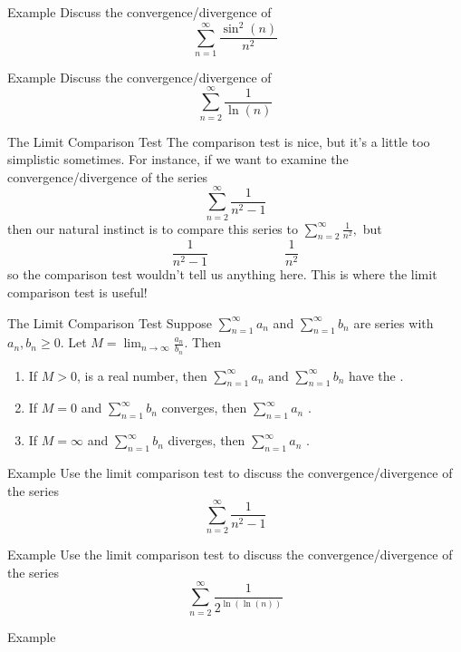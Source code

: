\documentclass[presentation]{beamer}
\begin{document}
\begin{frame}[label={sec:org9f4624e}]{Example}
Discuss the convergence/divergence of
\[
\sum\limits_{n=1}^{\infty} \frac{\sin^2(n)}{n^2}\]
\vspace{10in}
\end{frame}

\begin{frame}[label={sec:orgf86e12e}]{Example}
Discuss the convergence/divergence of
\[
\sum\limits_{n=2}^{\infty} \frac{1}{\ln(n)}\]
\vspace{10in}
\end{frame}

\begin{frame}[label={sec:org441e1b5}]{The Limit Comparison Test}
The comparison test is nice, but it's a little too simplistic sometimes.  For instance,
if we want to examine the convergence/divergence of the series
\[
\sum\limits_{n=2}^{\infty} \frac{1}{n^2-1}\]
then our natural instinct is to compare this series to \(\sum\limits_{n=2}^{\infty} \frac{1}{n^2},\)
but
\[
\frac{1}{n^2-1} \hspace{1in} \frac{1}{n^2}\]
so the comparison test wouldn't tell us anything here.  This is where the limit comparison
test is useful!
\end{frame}

\begin{frame}[label={sec:org70f04c3}]{The Limit Comparison Test}
Suppose \(\sum\limits_{n=1}^{\infty} a_n\) and \(\sum\limits_{n=1}^{\infty} b_n\) are series with \(a_n,b_n \ge 0\).
Let \(M = \lim_{n\rightarrow \infty} \frac{a_n}{b_n}\).  Then
\begin{enumerate}
\item If \(M > 0\), is a real number, then
\(\sum\limits_{n=1}^{\infty} a_n \text{ and } \sum\limits_{n=1}^{\infty} b_n\)
have the \uline{\hspace*{1in}}.
\item If \(M = 0\) and \(\sum\limits_{n=1}^{\infty} b_n\) converges, then
\(\sum\limits_{n=1}^{\infty} a_n\)
\uline{\hspace*{1in}}.
\item If \(M = \infty\) and \(\sum\limits_{n=1}^{\infty} b_n\) diverges, then
\(\sum\limits_{n=1}^{\infty} a_n\)
\uline{\hspace*{1in}}.
\end{enumerate}
\end{frame}

\begin{frame}[label={sec:org610709b}]{Example}
Use the limit comparison test to discuss the convergence/divergence of the series
\[
\sum\limits_{n=2}^{\infty} \frac{1}{n^2-1}\]
\vspace{10in}
\end{frame}

\begin{frame}[label={sec:orgce3b004}]{Example}
Use the limit comparison test to discuss the convergence/divergence of the series
\[
\sum\limits_{n=2}^{\infty} \frac{1}{2^{\ln(\ln(n))}}\]
\vspace{10in}
\end{frame}

\begin{frame}[label={sec:orge96cc1b}]{Example}
\end{frame}
\end{document}
